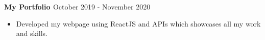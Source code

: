 \textbf{{My Portfolio \href{https://priyansh17.github.io/My-Portfolio/} {\faExternalLinkSquare}}} \hfill {\faCalendar} October 2019 - November 2020 \par
\begin{itemize}
	\item Developed my webpage using ReactJS and APIs which showcases all my work and skills.
\end{itemize}\vspace{0.1cm} \par
